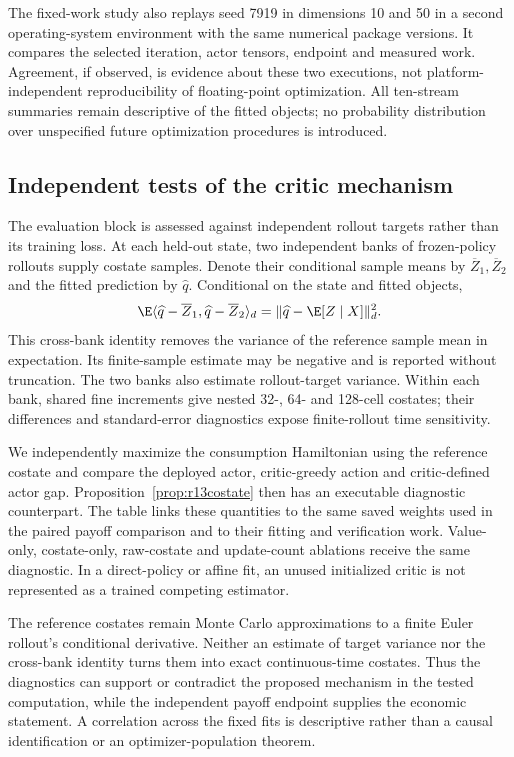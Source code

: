 

The fixed-work study also replays seed 7919 in dimensions 10 and 50 in a second operating-system environment with the same numerical package versions. It compares the selected iteration, actor tensors, endpoint and measured work. Agreement, if observed, is evidence about these two executions, not platform-independent reproducibility of floating-point optimization. All ten-stream summaries remain descriptive of the fitted objects; no probability distribution over unspecified future optimization procedures is introduced.

\subsection{Independent tests of the critic mechanism}\label{sec:r13mechanism}
The evaluation block is assessed against independent rollout targets rather than its training loss. At each held-out state, two independent banks of frozen-policy rollouts supply costate samples. Denote their conditional sample means by $\overline Z_1,\overline Z_2$ and the fitted prediction by $\widehat q$. Conditional on the state and fitted objects,
\[
 \E\langle\widehat q-\overline Z_1,
                  \widehat q-\overline Z_2\rangle_d
 =\|\widehat q-\E[Z\mid X]\|_d^2.
\]
This cross-bank identity removes the variance of the reference sample mean in expectation. Its finite-sample estimate may be negative and is reported without truncation. The two banks also estimate rollout-target variance. Within each bank, shared fine increments give nested 32-, 64- and 128-cell costates; their differences and standard-error diagnostics expose finite-rollout time sensitivity.

We independently maximize the consumption Hamiltonian using the reference costate and compare the deployed actor, critic-greedy action and critic-defined actor gap. Proposition~\ref{prop:r13costate} then has an executable diagnostic counterpart. The table links these quantities to the same saved weights used in the paired payoff comparison and to their fitting and verification work. Value-only, costate-only, raw-costate and update-count ablations receive the same diagnostic. In a direct-policy or affine fit, an unused initialized critic is not represented as a trained competing estimator.

The reference costates remain Monte Carlo approximations to a finite Euler rollout's conditional derivative. Neither an estimate of target variance nor the cross-bank identity turns them into exact continuous-time costates. Thus the diagnostics can support or contradict the proposed mechanism in the tested computation, while the independent payoff endpoint supplies the economic statement. A correlation across the fixed fits is descriptive rather than a causal identification or an optimizer-population theorem.

